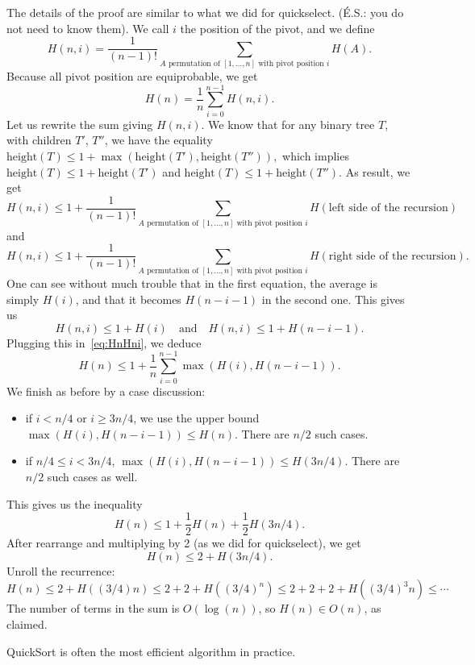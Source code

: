 \documentclass{report}
\begin{document}
The details of the proof are similar to what we did for quickselect.
({\'E.S.}: you do not need to know them).
We call $i$ the position of the pivot, and we define 
$$H(n,i) = \frac 1{(n-1)!} \sum_{\text{$A$ permutation of $[1,\dots,n]$ with pivot position $i$}} H(A).$$
Because all pivot position are equiprobable, we get 
\begin{equation}\label{eq:HnHni}
H(n) = \frac 1n \sum_{i=0}^{n-1} H(n,i).  
\end{equation}
Let us rewrite the sum giving $H(n,i)$. We know that for any binary tree $T$,
with children $T'$, $T''$, we have the equality
$\text{height}(T) \le 1 + \max(\text{height}(T'),\text{height}(T'')),$
which implies $\text{height}(T) \le 1 +\text{height}(T')$ and 
 $\text{height}(T) \le 1 +\text{height}(T'')$. As result,
we get 
$$H(n,i) \le  1 + \frac 1{(n-1)!} \sum_{\text{$A$ permutation of $[1,\dots,n]$ with pivot position $i$}} 
        H(\text{left side of the recursion})$$
and
$$H(n,i) \le  1 + \frac 1{(n-1)!} \sum_{\text{$A$ permutation of $[1,\dots,n]$ with pivot position $i$}} 
        H(\text{right side of the recursion}).$$
One can see without much trouble that in the first equation, the average is simply $H(i)$, 
and that it becomes $H(n-i-1)$ in the second one. This gives us
$$H(n,i) \le 1 + H(i) \quad\text{and}\quad H(n,i) \le 1 + H(n-i-1).$$
Plugging this in~\eqref{eq:HnHni}, we deduce
$$H(n) \le 1 + \frac 1n \sum_{i=0}^{n-1} \max(H(i), H(n-i-1)).$$
We finish as before by a case discussion:
\begin{itemize}
\item if $i < n/4$ or $i \ge 3n/4$, we use the upper bound 
  $\max(H(i), H(n-i-1)) \le H(n)$. There are $n/2$ such cases.
\item if $n/4 \le i < 3n/4$, $\max(H(i), H(n-i-1)) \le H(3n/4)$. There
  are $n/2$ such cases as well.
\end{itemize}
This gives us the inequality 
$$H(n) \le 1 + \frac 12 H(n) + \frac 12 H(3n/4).$$
After rearrange and multiplying by 2 (as we did for quickselect), 
we get 
$$H(n) \le 2 + H(3n/4).$$
Unroll the recurrence:
$$H(n) \le 2 + H( (3/4) n) \le 2 + 2 + H((3/4)^n) \le 2 + 2 + 2 + H((3/4)^3 n) \le \cdots$$
The number of terms in the sum is $O(\log(n))$, so $H(n) \in O(n)$, as claimed.

QuickSort is often the most efficient algorithm in practice.
\end{document}
